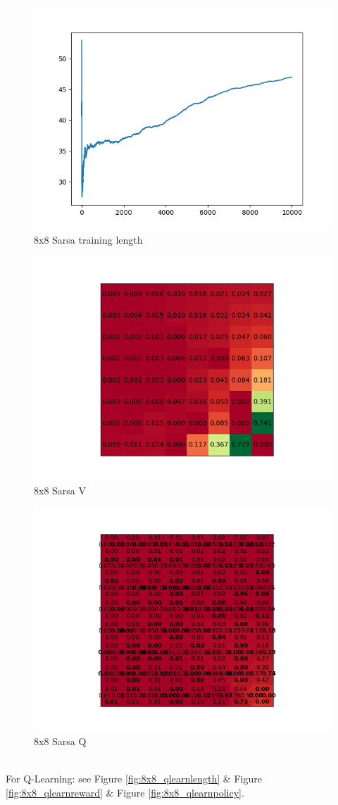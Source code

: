 \documentclass[a4paper]{article}
\begin{document}
\begin{figure}[!ht]
	\centering
	\includegraphics[width=0.8\linewidth]{8x8_sarsa_length}
	\caption{8x8 Sarsa training length}
	\label{fig:8x8_sarsalength}
\end{figure}
\begin{figure}[!ht]
	\centering
	\includegraphics[width=0.6\linewidth]{8x8_sarsa_v}
	\caption{8x8 Sarsa V}
	\label{fig:8x8_sarsareward}
\end{figure}
\begin{figure}[!ht]
	\centering
	\includegraphics[width=0.6\linewidth]{8x8_sarsa_q}
	\caption{8x8 Sarsa Q}
	\label{fig:8x8_sarsapolicy}
\end{figure}
~\\
For Q-Learning: see Figure \ref{fig:8x8_qlearnlength} \& Figure \ref{fig:8x8_qlearnreward} \& Figure \ref{fig:8x8_qlearnpolicy}.
\end{document}
